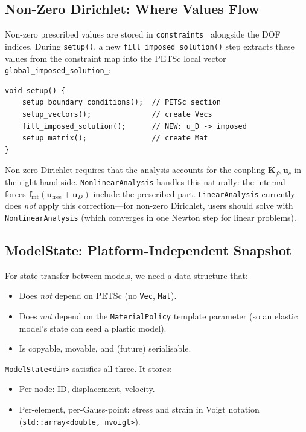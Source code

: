 \subsection{Non-Zero Dirichlet: Where Values Flow}
\label{sec:bc-nonzero}

Non-zero prescribed values are stored in \texttt{constraints\_} alongside
the DOF indices.  During \texttt{setup()}, a new
\texttt{fill\_imposed\_solution()} step extracts these values from the
constraint map into the PETSc local vector
\texttt{global\_imposed\_solution\_}:

\begin{lstlisting}
void setup() {
    setup_boundary_conditions();  // PETSc section
    setup_vectors();              // create Vecs
    fill_imposed_solution();      // NEW: u_D -> imposed
    setup_matrix();               // create Mat
}
\end{lstlisting}

\begin{remark}
Non-zero Dirichlet requires that the analysis accounts for the coupling
$\mathbf{K}_{fc}\,\mathbf{u}_c$ in the right-hand side.
\texttt{NonlinearAnalysis} handles this naturally: the internal forces
$\mathbf{f}_{\text{int}}(\mathbf{u}_{\text{free}} + \mathbf{u}_D)$ include
the prescribed part.  \texttt{LinearAnalysis} currently does \emph{not}
apply this correction---for non-zero Dirichlet, users should solve with
\texttt{NonlinearAnalysis} (which converges in one Newton step for linear
problems).
\end{remark}


\subsection{ModelState: Platform-Independent Snapshot}

For state transfer between models, we need a data structure that:
\begin{itemize}[nosep]
  \item Does \emph{not} depend on PETSc (no \texttt{Vec}, \texttt{Mat}).
  \item Does \emph{not} depend on the \texttt{MaterialPolicy} template parameter
        (so an elastic model's state can seed a plastic model).
  \item Is copyable, movable, and (future) serialisable.
\end{itemize}

\texttt{ModelState<dim>} satisfies all three.  It stores:
\begin{itemize}[nosep]
  \item Per-node: ID, displacement, velocity.
  \item Per-element, per-Gauss-point: stress and strain in Voigt notation
        (\texttt{std::array<double, nvoigt>}).
\end{itemize}

